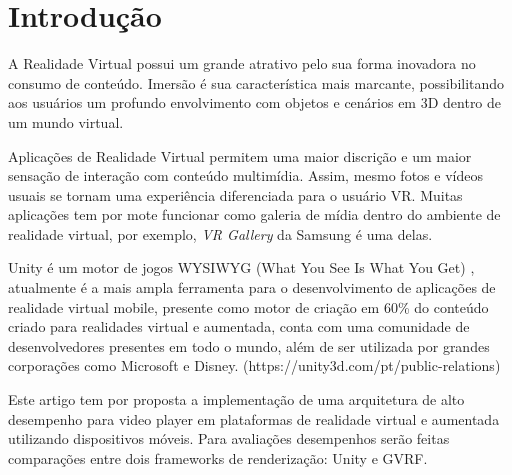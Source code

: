 \documentclass[sigconf]{acmart}
\begin{document}

\maketitle

\section{Introdução}


A Realidade Virtual possui um grande atrativo pelo sua forma inovadora no consumo de conteúdo. Imersão é sua característica mais marcante, possibilitando aos usuários um profundo envolvimento com objetos e cenários em 3D dentro de um mundo virtual.



Aplicações de Realidade Virtual permitem uma maior discrição e um maior sensação de interação com conteúdo multimídia. Assim, mesmo fotos e vídeos usuais se tornam uma experiência diferenciada para o usuário VR. Muitas aplicações tem por mote funcionar como galeria de mídia dentro do ambiente de realidade virtual, por exemplo, \textit{VR Gallery} da Samsung é uma delas.

Unity é um motor de jogos WYSIWYG (What You See Is What You Get) \cite{sv2015popolin}, atualmente é a mais ampla ferramenta para o desenvolvimento de aplicações de realidade virtual mobile, presente como motor de criação em 60\% do conteúdo criado para realidades virtual e aumentada, conta com uma comunidade de desenvolvedores presentes em todo o mundo, além de ser utilizada por grandes corporações como Microsoft e Disney. (https://unity3d.com/pt/public-relations)

Este artigo tem por proposta a implementação de uma arquitetura de alto desempenho para video player em plataformas de realidade virtual e aumentada utilizando dispositivos móveis. Para avaliações desempenhos serão feitas comparações entre dois frameworks de renderização: Unity e GVRF.
\end{document}
